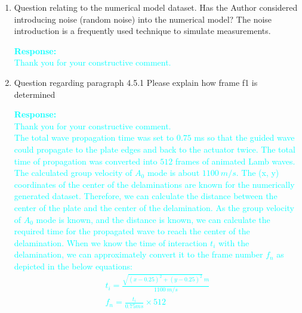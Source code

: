 \documentclass[11pt,a2paper]{report}
\begin{document}
{\begin{enumerate}
		\item Question relating to the numerical model dataset. 
		Has the Author considered introducing noise (random noise) into the numerical model? The noise introduction is a frequently used technique to simulate measurements.
		
		\textcolor{Cyan}{
			\textbf{Response:} \\
			Thank you for your constructive comment. \\
		}
		
		\item Question regarding paragraph 4.5.1 Please explain how frame f1 is
		determined
		
		\textcolor{Cyan}{
			\textbf{Response:} \\
			Thank you for your constructive comment. \\
			The total wave propagation time was set to \(0.75\) ms so that the guided wave could propagate to the plate edges and back to the actuator twice.
			The total time of propagation was converted into \(512\) frames of animated Lamb waves.
			The calculated group velocity of \(A_0\) mode is about \(1100\ m/s\).
			The (x, y) coordinates of the center of the delaminations are known for the numerically generated dataset.
			Therefore, we can calculate the distance between the center of the plate and the center of the delamination.
			As the group velocity of \(A_0\) mode is known, and the distance is known, we can calculate the required time for the propagated wave to reach the center of the delamination. 
			When we know the time of interaction \(t_i\) with the delamination, we can approximately convert it to the frame number \(f_n\) as depicted in the below equations:		
				\begin{gather*}
					t_i = \frac{\sqrt{(x-0.25)^2 +(y-0.25)^2} \ m}{1100\ m/s}
					\\
					f_n = \frac{t_i}{0.75ms} \times 512
				\end{gather*}			
		}
	\end{enumerate}
	}
\end{document}
